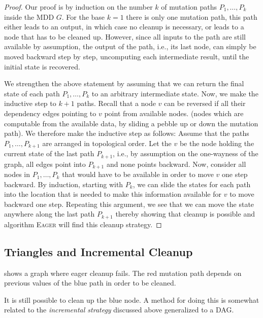 \begin{proof}
Our proof is by induction on the number $k$ of mutation paths $P_1, \ldots, P_k$
inside the MDD $G$. For the base $k=1$ there is only one mutation path, this
path either leads to an output, in which case no cleanup is necessary, or leads
to a node that has to be cleaned up. However, since all inputs to the path are
still available by assumption, the output of the path, i.e., its last node, can
simply be moved backward step by step, uncomputing each intermediate result,
until the initial state is recovered.

We strengthen the above statement by assuming that we can return the final state
of each path $P_1, \ldots, P_k$ to an arbitrary intermediate state.  Now, we
make the inductive step to $k+1$ paths. Recall that a node $v$ can be reversed
if all their dependency edges pointing to $v$ point from available nodes. (nodes
which are computable from the available data, by sliding a pebble up or down the
mutation path). We therefore make the inductive
step as follows: Assume that the paths $P_1, \ldots, P_{k+1}$ are arranged in
topological order. Let the $v$ be the node holding the current state of the last
path $P_{k+1}$, i.e., by assumption on the one-wayness of the graph, all edges
point into $P_{k+1}$ and none points backward. Now, consider all nodes in $P_1,
\ldots, P_k$ that would have to be available in order to move $v$ one step
backward. By induction, starting with $P_k$, we can slide the states for each
path into the location that is needed to make this information available for $v$
to move backward one step. Repeating this argument, we see that we can move the
state anywhere along the last path $P_{k+1}$ thereby showing that cleanup is
possible and algorithm \textsc{Eager} will find this cleanup strategy.

\end{proof}

\subsection{Triangles and Incremental Cleanup}

 shows a graph where eager cleanup fails. The red mutation
path depends on previous values of the blue path in order to be cleaned.

It is still possible to clean up the blue node. A method for doing this is
somewhat related to the \emph{incremental strategy} discussed above generalized
to a DAG.

